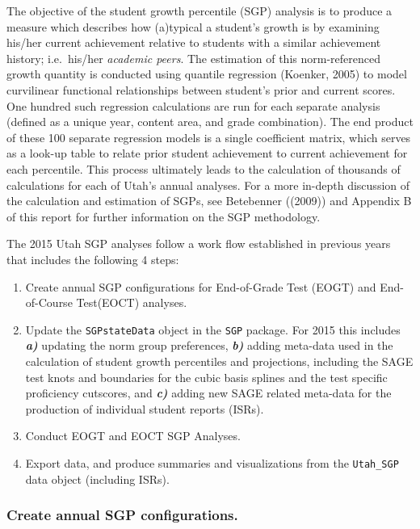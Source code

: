\documentclass[12pt]{article}
\begin{document}
The objective of the student growth percentile (SGP) analysis is to
produce a measure which describes how (a)typical a student's growth is
by examining his/her current achievement relative to students with a
similar achievement history; i.e.~his/her \emph{academic peers}. The
estimation of this norm-referenced growth quantity is conducted using
quantile regression (Koenker, 2005) to model curvilinear functional
relationships between student's prior and current scores. One hundred
such regression calculations are run for each separate analysis (defined
as a unique year, content area, and grade combination). The end product
of these 100 separate regression models is a single coefficient matrix,
which serves as a look-up table to relate prior student achievement to
current achievement for each percentile. This process ultimately leads
to the calculation of thousands of calculations for each of Utah's
annual analyses. For a more in-depth discussion of the calculation and
estimation of SGPs, see Betebenner ((2009)) and Appendix B of this
report for further information on the SGP methodology.

The 2015 Utah SGP analyses follow a work flow established in previous
years that includes the following 4 steps:

\begin{enumerate}
\def\labelenumi{\arabic{enumi}.}
\itemsep1pt\parskip0pt
\item
  Create annual SGP configurations for End-of-Grade Test (EOGT) and
  End-of-Course Test(EOCT) analyses.
\item
  Update the \texttt{SGPstateData} object in the \texttt{SGP} package.
  For 2015 this includes \textbf{\emph{a)}} updating the norm group
  preferences, \textbf{\emph{b)}} adding meta-data used in the
  calculation of student growth percentiles and projections, including
  the SAGE test knots and boundaries for the cubic basis splines and the
  test specific proficiency cutscores, and \textbf{\emph{c)}} adding new
  SAGE related meta-data for the production of individual student
  reports (ISRs).
\item
  Conduct EOGT and EOCT SGP Analyses.
\item
  Export data, and produce summaries and visualizations from the
  \texttt{Utah\_SGP} data object (including ISRs).
\end{enumerate}

\subsubsection{Create annual SGP
configurations.}\label{create-annual-sgp-configurations.}
\end{document}

